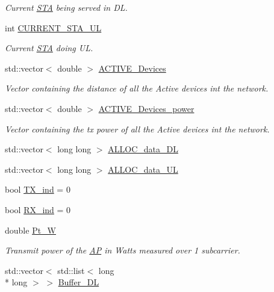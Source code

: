 \begin{DoxyCompactItemize}
\begin{DoxyCompactList}\small\item\em Current \hyperlink{classSTA}{S\-T\-A} being served in D\-L. \end{DoxyCompactList}\item 
int \hyperlink{classAP_a78174ebdb27995f7dce372fc78f3e486}{C\-U\-R\-R\-E\-N\-T\-\_\-\-S\-T\-A\-\_\-\-U\-L}
\begin{DoxyCompactList}\small\item\em Current \hyperlink{classSTA}{S\-T\-A} doing U\-L. \end{DoxyCompactList}\item 
std\-::vector$<$ double $>$ \hyperlink{classAP_ab6dd8d2144b1be8dea239c3d76fc60cd}{A\-C\-T\-I\-V\-E\-\_\-\-Devices}
\begin{DoxyCompactList}\small\item\em Vector containing the distance of all the Active devices int the network. \end{DoxyCompactList}\item 
std\-::vector$<$ double $>$ \hyperlink{classAP_ad666997cd964596ea69b7ed750fadcfa}{A\-C\-T\-I\-V\-E\-\_\-\-Devices\-\_\-power}
\begin{DoxyCompactList}\small\item\em Vector containing the tx power of all the Active devices int the network. \end{DoxyCompactList}\item 
std\-::vector$<$ long long $>$ \hyperlink{classAP_a88e8d95cfbca5d598ec6cd900efa2b30}{A\-L\-L\-O\-C\-\_\-data\-\_\-\-D\-L}
\item 
std\-::vector$<$ long long $>$ \hyperlink{classAP_ae5567916229fb09fbb83af3cfad5d71d}{A\-L\-L\-O\-C\-\_\-data\-\_\-\-U\-L}
\item 
bool \hyperlink{classAP_adce53b419ff50565a7084b8d893c5be1}{T\-X\-\_\-ind} = 0
\item 
bool \hyperlink{classAP_af5b1c2bc10a9ce9f3007bbf37f95f144}{R\-X\-\_\-ind} = 0
\item 
double \hyperlink{classAP_a10998008dbe6e924211af8d9ee155534}{Pt\-\_\-\-W}
\begin{DoxyCompactList}\small\item\em Transmit power of the \hyperlink{classAP}{A\-P} in Watts measured over 1 subcarrier. \end{DoxyCompactList}\item 
std\-::vector$<$ std\-::list$<$ long \\*
long $>$ $>$ \hyperlink{classAP_af5970c0fdff7405ec2043c7fdd8cb427}{Buffer\-\_\-\-D\-L}

\end{DoxyCompactItemize}

